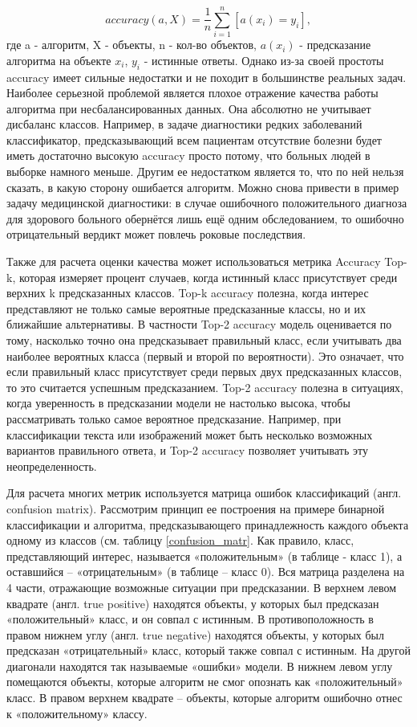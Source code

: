 \documentclass[a4paper,12pt]{extarticle}
\begin{document}
\begin{equation}
	\label{acc}
	accuracy(a, X) = \frac{1}{n}\sum_{i=1}^{n}[a(x_i)=y_i],
\end{equation}
где a - алгоритм, X - объекты, n - кол-во объектов,	$a(x_i)$ - предсказание алгоритма на объекте $x_i$,	$y_i$ - истинные ответы. Однако из-за своей простоты accuracy имеет сильные недостатки и не походит в большинстве реальных задач. Наиболее серьезной проблемой является плохое отражение качества работы алгоритма при несбалансированных данных. Она абсолютно не учитывает дисбаланс классов. Например, в задаче диагностики редких заболеваний классификатор, предсказывающий всем пациентам отсутствие болезни будет иметь достаточно высокую accuracy просто потому, что больных людей в выборке намного меньше. Другим ее недостатком является то, что по ней нельзя сказать, в какую сторону ошибается алгоритм. Можно снова привести в пример задачу медицинской диагностики: в случае ошибочного положительного диагноза для здорового больного обернётся лишь ещё одним обследованием, то ошибочно отрицательный вердикт может повлечь роковые последствия.

Также для расчета оценки качества может использоваться метрика Accuracy Top-k, которая измеряет процент случаев, когда истинный класс присутствует среди верхних k предсказанных классов. Top-k accuracy полезна, когда интерес представляют не только самые вероятные предсказанные классы, но и их ближайшие альтернативы. В частности Top-2 accuracy модель оценивается по тому, насколько точно она предсказывает правильный класс, если учитывать два наиболее вероятных класса (первый и второй по вероятности). Это означает, что если правильный класс присутствует среди первых двух предсказанных классов, то это считается успешным предсказанием. Top-2 accuracy полезна в ситуациях, когда уверенность в предсказании модели не настолько высока, чтобы рассматривать только самое вероятное предсказание. Например, при классификации текста или изображений может быть несколько возможных вариантов правильного ответа, и Top-2 accuracy позволяет учитывать эту неопределенность.

Для расчета многих метрик используется матрица ошибок классификаций (англ. confusion matrix). Рассмотрим принцип ее построения на примере бинарной классификации и алгоритма, предсказывающего принадлежность каждого объекта одному из классов (см. таблицу \ref{confusion_matr}. Как правило, класс, представляющий интерес, называется «положительным» (в таблице - класс 1), а оставшийся – «отрицательным» (в таблице – класс 0). Вся матрица разделена на 4 части, отражающие возможные ситуации при предсказании. В верхнем левом квадрате (англ. true positive) находятся объекты, у которых был предсказан «положительный» класс, и он совпал с истинным. В противоположность в правом нижнем углу (англ. true negative) находятся объекты, у которых был предсказан «отрицательный» класс, который также совпал с истинным. На другой диагонали находятся так называемые «ошибки» модели. В нижнем левом углу помещаются объекты, которые алгоритм не смог опознать как «положительный» класс. В правом верхнем квадрате – объекты, которые алгоритм ошибочно отнес к «положительному» классу.
\end{document}
